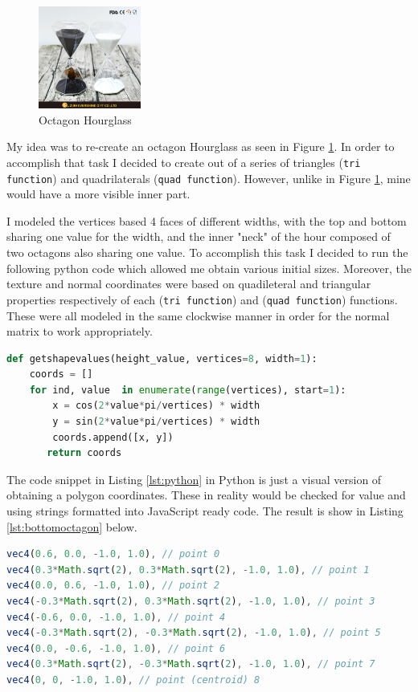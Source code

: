 \documentclass[12pt,a4paper]{article}
\begin{document}
\begin{figure}
\centering
\includegraphics[width=0.3\textwidth, angle = 0]{img/hourglass.png}
\caption{Octagon Hourglass \cite{hourglass}}
\label{img:hourglass}
\end{figure}
My idea was to re-create an octagon Hourglass as seen in Figure \ref{img:hourglass}. In order to accomplish that task I decided to create out of a series of triangles (\texttt{tri function{}}) and quadrilaterals (\texttt{quad function{}}). However, unlike in Figure \ref{img:hourglass}, mine would have a more visible inner part.  

I modeled the vertices based 4 faces of different widths, with the top and bottom sharing one value for the width, and the inner "neck" of the hour composed of two octagons also sharing one value. To accomplish this task I decided to run the following python code which allowed me obtain various initial sizes. Moreover, the texture and normal coordinates were based on quadileteral and triangular properties respectively of each  (\texttt{tri function{}}) and (\texttt{quad function{}}) functions. These were all modeled in the same clockwise manner in order for the normal matrix to work appropriately.
\clearpage
\begin{lstlisting}[caption={Getting values for the vertices},label={lst:python},language=python]
def getshapevalues(height_value, vertices=8, width=1):
    coords = []
    for ind, value  in enumerate(range(vertices), start=1):
        x = cos(2*value*pi/vertices) * width
        y = sin(2*value*pi/vertices) * width
        coords.append([x, y])
       return coords
\end{lstlisting}
The  code snippet in Listing \ref{lst:python} in Python is just a visual version of obtaining a polygon coordinates. These in reality would be checked for value and using strings formatted into JavaScript ready code. The result is show in Listing \ref{lst:bottomoctagon} below. 

\begin{lstlisting}[caption={Bottom Octagon example vertex defintions},label={lst:bottomoctagon},language=JavaScript]
vec4(0.6, 0.0, -1.0, 1.0), // point 0
vec4(0.3*Math.sqrt(2), 0.3*Math.sqrt(2), -1.0, 1.0), // point 1
vec4(0.0, 0.6, -1.0, 1.0), // point 2
vec4(-0.3*Math.sqrt(2), 0.3*Math.sqrt(2), -1.0, 1.0), // point 3
vec4(-0.6, 0.0, -1.0, 1.0), // point 4
vec4(-0.3*Math.sqrt(2), -0.3*Math.sqrt(2), -1.0, 1.0), // point 5
vec4(0.0, -0.6, -1.0, 1.0), // point 6
vec4(0.3*Math.sqrt(2), -0.3*Math.sqrt(2), -1.0, 1.0), // point 7
vec4(0, 0, -1.0, 1.0), // point (centroid) 8
\end{lstlisting}
\end{document}
